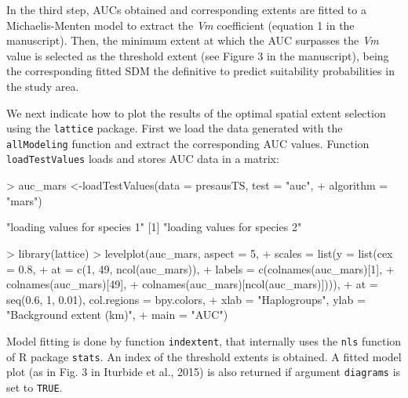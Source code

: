 \documentclass[10pt,a4paper]{article}
\begin{document}
In the third step, AUCs obtained and corresponding extents are fitted to a Michaelis-Menten model to extract the \textit{Vm} coefficient (equation 1 in the manuscript). Then, the minimum extent at which the AUC surpasses the \textit{Vm} value is selected as the threshold extent (see Figure 3 in the manuscript), being the corresponding fitted SDM the definitive to predict suitability probabilities in the study area.

We next indicate how to plot the results of the optimal spatial extent selection using the \texttt{lattice} package. First we load the data generated with the \texttt{allModeling} function and extract the corresponding AUC values. Function \texttt{loadTestValues} loads and stores AUC data in a matrix:

\begin{Schunk}
\begin{Sinput}
> auc_mars <-loadTestValues(data = presausTS, test = "auc", 
+                           algorithm = "mars")
\end{Sinput}
\begin{Soutput}
[1] "loading values for species 1"
[1] "loading values for species 2"
\end{Soutput}
\begin{Sinput}
> library(lattice)
> levelplot(auc_mars, aspect = 5, 
+           scales = list(y = list(cex = 0.8, 
+               at = c(1, 49, ncol(auc_mars)), 
+               labels = c(colnames(auc_mars)[1],
+                         colnames(auc_mars)[49],
+                         colnames(auc_mars)[ncol(auc_mars)]))), 
+           at = seq(0.6, 1, 0.01), col.regions = bpy.colors,
+           xlab = "Haplogroups", ylab = "Background extent (km)", 
+           main = "AUC")
\end{Sinput}
\end{Schunk}


Model fitting is done by function \texttt{indextent}, that internally uses the \texttt{nls} function of R package \texttt{stats}. An index of the threshold extents is obtained. A fitted model plot (as in Fig. 3 in Iturbide et al., 2015) is also returned if argument \texttt{diagrams} is set to \texttt{TRUE}. 
\end{document}
